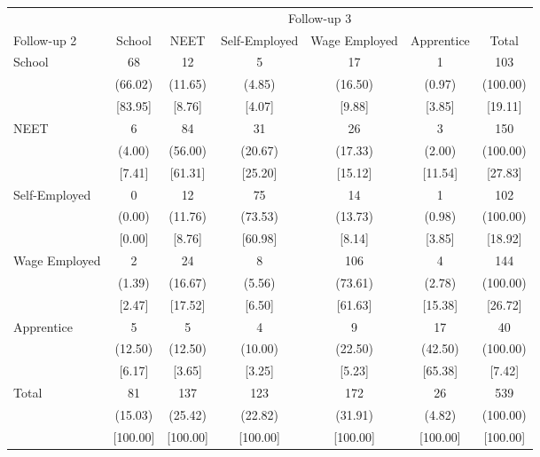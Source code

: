 {
\def\sym#1{\ifmmode^{#1}\else\(^{#1}\)\fi}
\begin{tabular}{l*{6}{c}}
\hline\hline
            &\multicolumn{6}{c}{Follow-up 3}                                              \\
Follow-up 2 &      School&        NEET&Self-Employed&Wage Employed&  Apprentice&       Total\\
\hline
School      &          68&          12&           5&          17&           1&         103\\
            &     (66.02)&     (11.65)&      (4.85)&     (16.50)&      (0.97)&    (100.00)\\
            &     [83.95]&      [8.76]&      [4.07]&      [9.88]&      [3.85]&     [19.11]\\
NEET        &           6&          84&          31&          26&           3&         150\\
            &      (4.00)&     (56.00)&     (20.67)&     (17.33)&      (2.00)&    (100.00)\\
            &      [7.41]&     [61.31]&     [25.20]&     [15.12]&     [11.54]&     [27.83]\\
Self-Employed&           0&          12&          75&          14&           1&         102\\
            &      (0.00)&     (11.76)&     (73.53)&     (13.73)&      (0.98)&    (100.00)\\
            &      [0.00]&      [8.76]&     [60.98]&      [8.14]&      [3.85]&     [18.92]\\
Wage Employed&           2&          24&           8&         106&           4&         144\\
            &      (1.39)&     (16.67)&      (5.56)&     (73.61)&      (2.78)&    (100.00)\\
            &      [2.47]&     [17.52]&      [6.50]&     [61.63]&     [15.38]&     [26.72]\\
Apprentice  &           5&           5&           4&           9&          17&          40\\
            &     (12.50)&     (12.50)&     (10.00)&     (22.50)&     (42.50)&    (100.00)\\
            &      [6.17]&      [3.65]&      [3.25]&      [5.23]&     [65.38]&      [7.42]\\
Total       &          81&         137&         123&         172&          26&         539\\
            &     (15.03)&     (25.42)&     (22.82)&     (31.91)&      (4.82)&    (100.00)\\
            &    [100.00]&    [100.00]&    [100.00]&    [100.00]&    [100.00]&    [100.00]\\
\hline\hline
\end{tabular}
}
